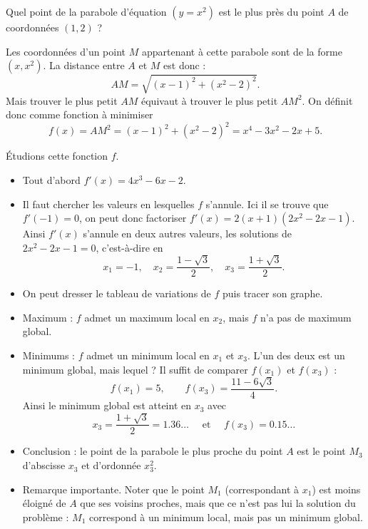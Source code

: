 \documentclass[11pt,class=report,crop=false]{standalone}
\begin{document}
\begin{exemple}
Quel point de la parabole d'équation $(y=x^2)$ est le plus près du point $A$ de coordonnées $(1,2)$ ?


Les coordonnées d'un point $M$ appartenant à cette parabole sont de la forme $(x,x^2)$. 
La distance entre $A$ et $M$ est donc :
$$AM= \sqrt{(x-1)^2+(x^2-2)^2}.$$
Mais trouver le plus petit $AM$ équivaut à trouver le plus petit $AM^2$.
On définit donc comme fonction à minimiser 
$$f(x) = AM^2 = (x-1)^2+(x^2-2)^2 = x^4 - 3x^2 - 2x + 5.$$


\'Etudions cette fonction $f$.

\begin{itemize}
  \item Tout d'abord $f'(x) = 4x^3 - 6x - 2$.
  \item Il faut chercher les valeurs en lesquelles $f$ s'annule. Ici il se trouve que $f'(-1)=0$, on peut donc factoriser $f'(x) = 2(x+1)(2x^2-2x-1)$.
  Ainsi $f'(x)$ s'annule en deux autres valeurs, les solutions de $2x^2-2x-1=0$, c'est-à-dire en 
  $$x_1 = -1,\quad x_2 = \frac{1-\sqrt3}{2},\quad x_3 = \frac{1+\sqrt3}{2}.$$

  \item On peut dresser le tableau de variations de $f$ puis tracer son graphe.
   
  
  
  \item Maximum : $f$ admet un maximum local en $x_2$, mais $f$ n'a pas de maximum global.
  
  \item Minimums : $f$ admet un minimum local en $x_1$ et $x_3$. L'un des deux est un minimum global, mais lequel ? Il suffit de comparer $f(x_1)$ et $f(x_3)$ :
  $$f(x_1) = 5, \qquad f(x_3) = \frac{11-6\sqrt{3}}{4}.$$
  Ainsi le minimum global est atteint en $x_3$ avec
  $$x_3 = \frac{1+\sqrt3}{2} = 1.36\ldots 
  \quad \text{ et } \quad
  f(x_3) = 0.15\ldots$$

  \item Conclusion : le point de la parabole le plus proche du point $A$ est le point $M_3$ d'abscisse $x_3$ et d'ordonnée $x_3^2$. 
  
  \item Remarque importante. Noter que le point $M_1$ (correspondant à $x_1$) est moins éloigné de $A$ que ses voisins proches, mais que ce n'est pas lui la solution du problème : $M_1$ correspond à un minimum local, mais pas un minimum global.
\end{itemize}
\end{exemple}
\end{document}
